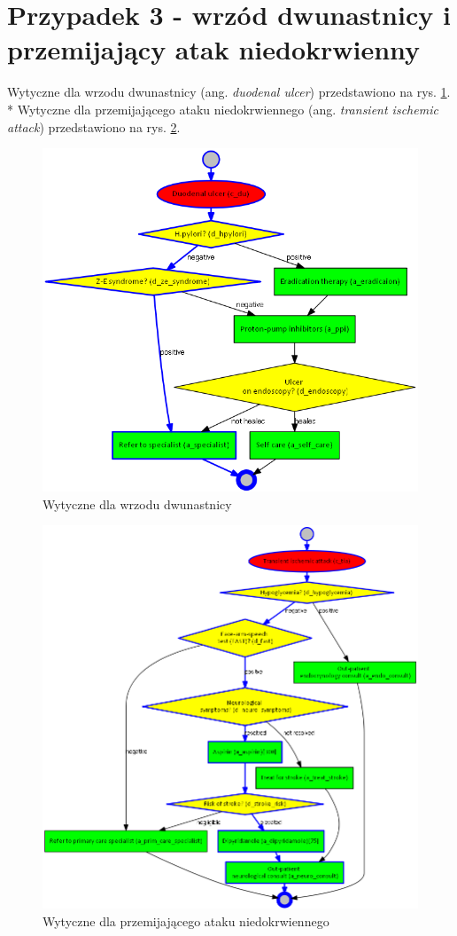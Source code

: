 \section{Przypadek 3 - wrzód dwunastnicy i przemijający atak niedokrwienny}
Wytyczne dla wrzodu dwunastnicy (ang. \textit{duodenal ulcer}) przedstawiono na rys. \ref{fig:du}.\\*
Wytyczne dla przemijającego ataku niedokrwiennego (ang. \textit{transient ischemic attack}) przedstawiono na rys. \ref{fig:tia}.
\begin{figure}[H]
\centering
\includegraphics[scale=0.5]{img/du.png}
\caption{Wytyczne dla wrzodu dwunastnicy}
\label{fig:du}
\end{figure}
\newpage
\begin{figure}[H]
\centering
\includegraphics[scale=0.5]{img/tia.png}
\caption{Wytyczne dla przemijającego ataku niedokrwiennego}
\label{fig:tia}
\end{figure}
